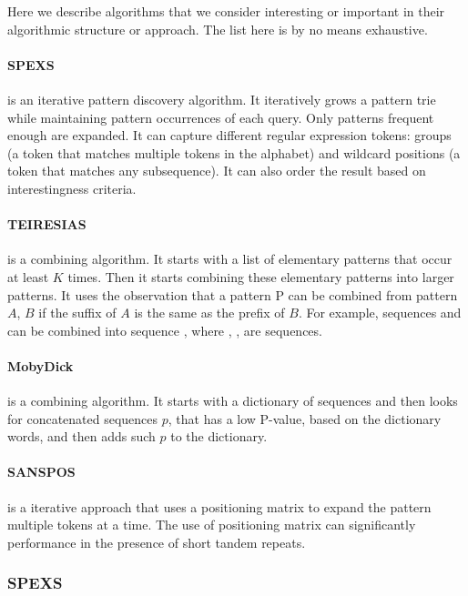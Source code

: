 Here we describe algorithms that we consider interesting or important in their algorithmic structure or approach. The list here is by no means exhaustive.

\paragraph{SPEXS \cite{spexs}} is an iterative pattern discovery algorithm. It iteratively grows a pattern trie while maintaining pattern occurrences of each query. Only patterns frequent enough are expanded. It can capture different regular expression tokens: groups (a token that matches multiple tokens in the alphabet) and wildcard positions (a token that matches any subsequence). It can also order the result based on interestingness criteria.

\paragraph{TEIRESIAS \cite{TEIRESIAS}} is a combining algorithm. It starts with a list of elementary patterns that occur at least $K$ times. Then it starts combining these elementary patterns into larger patterns. It uses the observation that a pattern P can be combined from pattern $A$, $B$ if the suffix of $A$ is the same as the prefix of $B$. For example, sequences \R{$\alpha\Delta$} and \R{$\Delta\beta$}can be combined into sequence \R{$\alpha\Delta\beta$}, where \R{$\alpha$}, \R{$\Delta$}, \R{$\beta$} are sequences.

\paragraph{MobyDick \cite{MobyDick}} is a combining algorithm. It starts with a dictionary of sequences and then looks for concatenated sequences $p$, that has a low P-value, based on the dictionary words, and then adds such $p$ to the dictionary.

\paragraph{SANSPOS \cite{NewDataStructures}} is a iterative approach that uses a positioning matrix to expand the pattern multiple tokens at a time. The use of positioning matrix can significantly performance in the presence of short tandem repeats.

\subsubsection{SPEXS}

